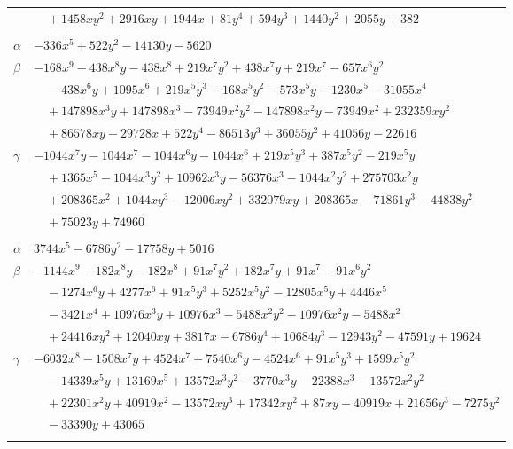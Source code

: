 \documentclass[11pt]{article}
\begin{document}
\begin{longtable}{@{}ll@{}}
 & $\quad +1458xy^{2}+2916xy+1944x+81y^{4}+594y^{3}+1440y^{2}+2055y+382$\\
\addlinespace[3pt]
\multicolumn{2}{@{}l}{$\{i,j\}=\{13,20\}$, $k_{ij}=2^{3}\cdot 17$}\\
$\alpha$ & $-336x^{5}+522y^{2}-14130y-5620$\\
$\beta$ & $-168x^{9}-438x^{8}y-438x^{8}+219x^{7}y^{2}+438x^{7}y+219x^{7}-657x^{6}y^{2}$\\
 & $\quad -438x^{6}y+1095x^{6}+219x^{5}y^{3}-168x^{5}y^{2}-573x^{5}y-1230x^{5}-31055x^{4}$\\
 & $\quad +147898x^{3}y+147898x^{3}-73949x^{2}y^{2}-147898x^{2}y-73949x^{2}+232359xy^{2}$\\
 & $\quad +86578xy-29728x+522y^{4}-86513y^{3}+36055y^{2}+41056y-22616$\\
$\gamma$ & $-1044x^{7}y-1044x^{7}-1044x^{6}y-1044x^{6}+219x^{5}y^{3}+387x^{5}y^{2}-219x^{5}y$\\
 & $\quad +1365x^{5}-1044x^{3}y^{2}+10962x^{3}y-56376x^{3}-1044x^{2}y^{2}+275703x^{2}y$\\
 & $\quad +208365x^{2}+1044xy^{3}-12006xy^{2}+332079xy+208365x-71861y^{3}-44838y^{2}$\\
 & $\quad +75023y+74960$\\
\addlinespace[3pt]
\multicolumn{2}{@{}l}{$\{i,j\}=\{13,22\}$, $k_{ij}=2^{3}\cdot 5\cdot 11$}\\
$\alpha$ & $3744x^{5}-6786y^{2}-17758y+5016$\\
$\beta$ & $-1144x^{9}-182x^{8}y-182x^{8}+91x^{7}y^{2}+182x^{7}y+91x^{7}-91x^{6}y^{2}$\\
 & $\quad -1274x^{6}y+4277x^{6}+91x^{5}y^{3}+5252x^{5}y^{2}-12805x^{5}y+4446x^{5}$\\
 & $\quad -3421x^{4}+10976x^{3}y+10976x^{3}-5488x^{2}y^{2}-10976x^{2}y-5488x^{2}$\\
 & $\quad +24416xy^{2}+12040xy+3817x-6786y^{4}+10684y^{3}-12943y^{2}-47591y+19624$\\
$\gamma$ & $-6032x^{8}-1508x^{7}y+4524x^{7}+7540x^{6}y-4524x^{6}+91x^{5}y^{3}+1599x^{5}y^{2}$\\
 & $\quad -14339x^{5}y+13169x^{5}+13572x^{3}y^{2}-3770x^{3}y-22388x^{3}-13572x^{2}y^{2}$\\
 & $\quad +22301x^{2}y+40919x^{2}-13572xy^{3}+17342xy^{2}+87xy-40919x+21656y^{3}-7275y^{2}$\\
 & $\quad -33390y+43065$\\
\addlinespace[3pt]
\multicolumn{2}{@{}l}{$\{i,j\}=\{13,25\}$, $k_{ij}=3^{2}\cdot 5^{2}$}\\

\end{longtable}
\end{document}
